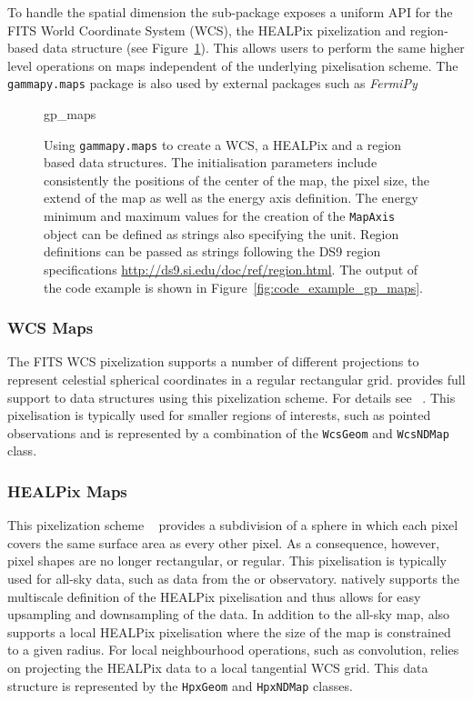 \documentclass[longauth]{aa}
\newcommand{\code}[1]{\texttt{#1}}
\begin{document}
To handle the spatial dimension the sub-package exposes a uniform API for
the FITS World Coordinate System (WCS), the HEALPix pixelization and
region-based data structure (see Figure~\ref{fig*:minted:gp_maps}).
This allows users to perform the same higher level operations on maps
independent of the underlying pixelisation scheme. The \code{gammapy.maps}
package is also used by external packages such as \textit{FermiPy}~\citep{Wood2017}

\begin{figure}
	\small
	{gp_maps}

	\caption{
        Using \code{gammapy.maps} to create a WCS, a HEALPix and a region
		based data structures. The initialisation parameters include
        consistently the positions of the center of the map, the pixel
        size, the extend of the map as well as the energy axis definition.
        The energy minimum and maximum values for the creation of the
        \code{MapAxis} object can be defined as strings also specifying the
        unit. Region definitions can be passed as strings following
        the DS9 region specifications \url{http://ds9.si.edu/doc/ref/region.html}. The output
		of the code example is shown in Figure~\ref{fig:code_example_gp_maps}.
        }
    \label{fig*:minted:gp_maps}
\end{figure}

\subsubsection{WCS Maps}
The FITS WCS pixelization supports a number of different projections to
represent celestial spherical coordinates in a regular rectangular grid.
\gammapy provides full support to data structures using this pixelization
scheme. For details see ~\cite{Calabretta2002}. This pixelisation
is typically used for smaller regions of interests, such as pointed
observations and is represented by a combination of the
\code{WcsGeom} and \code{WcsNDMap} class.


\subsubsection{HEALPix Maps}
This pixelization scheme ~\citep{Calabretta2002, Gorski2005} provides a
subdivision of a sphere in which each pixel covers the same surface area as
every other pixel. As a consequence, however, pixel shapes are no longer
rectangular, or regular.
This pixelisation is typically used for all-sky data, such as data
from the \hawc or \fermi observatory. \gammapy natively supports
the multiscale definition of the HEALPix pixelisation and thus
allows for easy upsampling and downsampling of the data. In addition to
the all-sky map, \gammapy also supports a local HEALPix
pixelisation where the size of the map is constrained to a given
radius.
For local neighbourhood operations, such as convolution, \gammapy relies
on projecting the HEALPix data to a local tangential WCS grid.
This data structure is represented by the \code{HpxGeom} and \code{HpxNDMap}
classes. 
\end{document}
